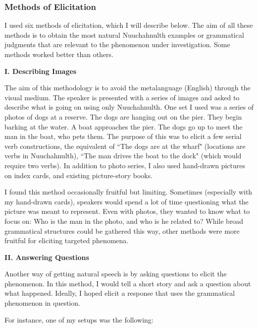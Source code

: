 \subsubsection{Methods of Elicitation}

I used six methods of elicitation, which I will describe below. The aim of all these methods is to obtain the most natural Nuuchahnulth examples or grammatical judgments that are relevant to the phenomenon under investigation. Some methods worked better than others.

\vspace{8pt}

\noindent \textbf{I. Describing Images}

The aim of this methodology is to avoid the metalanguage (English) through the visual medium. The speaker is presented with a series of images and asked to describe what is going on using only Nuuchahnulth. One set I used was a series of photos of dogs at a reserve. The dogs are hanging out on the pier. They begin barking at the water. A boat approaches the pier. The dogs go up to meet the man in the boat, who pets them. The purpose of this was to elicit a few serial verb constructions, the equivalent of ``The dogs are at the wharf" (locations are verbs in Nuuchahnulth), ``The man drives the boat to the dock" (which would require two verbs). In addition to photo series, I also used hand-drawn pictures on index cards, and existing picture-story books.

I found this method occasionally fruitful but limiting. Sometimes (especially with my hand-drawn cards), speakers would spend a lot of time questioning what the picture was meant to represent. Even with photos, they wanted to know what to focus on: Who is the man in the photo, and who is he related to? While broad grammatical structures could be gathered this way, other methods were more fruitful for eliciting targeted phenomena.

\vspace{8pt}

\noindent \textbf{II. Answering Questions}

Another way of getting natural speech is by asking questions to elicit the phenomenon. In this method, I would tell a short story and ask a question about what happened. Ideally, I hoped elicit a response that uses the grammatical phenomenon in question.

For instance, one of my setups was the following:

